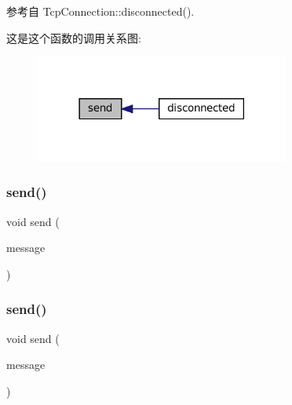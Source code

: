 参考自 Tcp\+Connection\+::disconnected().

这是这个函数的调用关系图\+:
\nopagebreak
\begin{figure}[H]
\begin{center}
\leavevmode
\includegraphics[width=237pt]{classmuduo_1_1net_1_1TcpConnection_a9c8ef4c9c94e6ccd8cb7233d6ecb9834_icgraph}
\end{center}
\end{figure}
\mbox{\label{classmuduo_1_1net_1_1TcpConnection_a6204afa3a5014326827f59119b62e0f2}} 
\subsubsection{\texorpdfstring{send()}{send()}\hspace{0.1cm}{\footnotesize\ttfamily [2/3]}}
{\footnotesize\ttfamily void send (\begin{DoxyParamCaption}\item[{const \hyperlink{classmuduo_1_1StringPiece}{String\+Piece} \&}]{message }\end{DoxyParamCaption})}

\mbox{\label{classmuduo_1_1net_1_1TcpConnection_a92d6542b89b04de2d77fc25b34ccb9dc}} 
\subsubsection{\texorpdfstring{send()}{send()}\hspace{0.1cm}{\footnotesize\ttfamily [3/3]}}
{\footnotesize\ttfamily void send (\begin{DoxyParamCaption}\item[{\hyperlink{classmuduo_1_1net_1_1Buffer}{Buffer} $\ast$}]{message }\end{DoxyParamCaption})}


